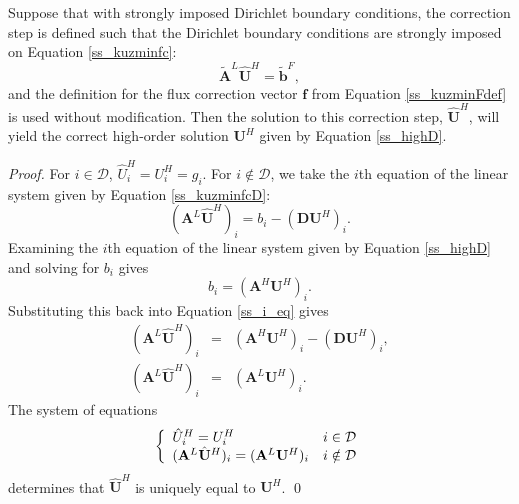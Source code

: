 \begin{lemma}
   Suppose that with strongly imposed Dirichlet boundary conditions, the
   correction step is defined such that the Dirichlet boundary conditions
   are strongly imposed on Equation \ref{ss_kuzminfc}:
   \begin{equation}\label{ss_kuzminfcD}
      \tilde{\mathbf{A}}^L\hat{\mathbf{U}}^H
         = \tilde{\mathbf{b}}^F,
   \end{equation}
   and the definition for
   the flux correction vector $\mathbf{f}$ from
   Equation \ref{ss_kuzminFdef} is used without modification. Then the solution
   to this correction step, $\hat{\mathbf{U}}^H$, will yield the
   correct high-order solution $\mathbf{U}^H$ given by Equation \ref{ss_highD}.
\end{lemma}
\begin{proof}
   For $i\in\mathcal{D}$, $\hat{U}^H_i = U^H_i = g_i$. For $i\notin\mathcal{D}$,
   we take the $i$th equation of the linear system given by Equation \ref{ss_kuzminfcD}:
   \begin{equation}\label{ss_i_eq}
      (\mathbf{A}^L\hat{\mathbf{U}}^H)_i = b_i - (\mathbf{D}\mathbf{U}^H)_i.
   \end{equation}
   Examining the $i$th equation of the linear system given by Equation \ref{ss_highD}
   and solving for $b_i$ gives
   \begin{equation}
      b_i = (\mathbf{A}^H\mathbf{U}^H)_i.
   \end{equation}
   Substituting this back into Equation \ref{ss_i_eq} gives
   \begin{eqnarray}
      (\mathbf{A}^L\hat{\mathbf{U}}^H)_i & = & (\mathbf{A}^H\mathbf{U}^H)_i - (\mathbf{D}\mathbf{U}^H)_i,\\
      (\mathbf{A}^L\hat{\mathbf{U}}^H)_i & = & (\mathbf{A}^L\mathbf{U}^H)_i.
   \end{eqnarray}
   The system of equations
   \begin{equation}
      \left\{
         \begin{array}{l l}
            \hat{U}^H_i = U^H_i & i\in\mathcal{D}\\
            (\mathbf{A}^L\hat{\mathbf{U}}^H)_i = (\mathbf{A}^L\mathbf{U}^H)_i
               & i\notin\mathcal{D}
         \end{array}
      \right.
   \end{equation}
   determines that $\hat{\mathbf{U}}^H$ is uniquely equal to $\mathbf{U}^H$.
   \qed
\end{proof}
